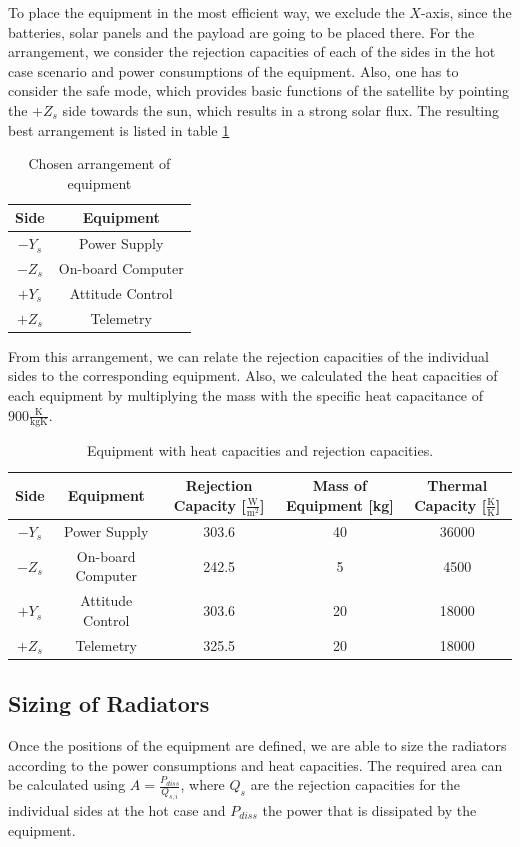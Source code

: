To place the equipment in the most efficient way, we exclude the $X$-axis, since the batteries, solar panels and the payload are going to be placed there. For the arrangement, we consider the rejection capacities of each of the sides in the hot case scenario and power consumptions of the equipment. Also, one has to consider the safe mode, which provides basic functions of the satellite by pointing the +$Z_{s}$ side towards the sun, which results in a strong solar flux. The resulting best arrangement is listed in table \ref{tab:arrangement}

\begin{table}[H]
\centering
\begin{tabular}{ | c| c|}
\hline 
Side & Equipment  \\ \hline
$-Y_{s}$ & Power Supply  \\ \hline
$-Z_{s}$ &On-board Computer \\\hline
$+Y_{s}$ &Attitude Control \\ \hline
$+Z_{s}$ &Telemetry   \\ \hline
\end{tabular}
\caption{Chosen arrangement of equipment}
\label{tab:arrangement}
\end{table}
From this arrangement, we can relate the rejection capacities of the individual sides to the corresponding equipment. Also, we calculated the heat capacities of each equipment by multiplying the mass with the specific heat capacitance of $900\frac{\mathrm{K}}{\mathrm{kgK}}$.


\begin{table}[H]
\centering
\begin{tabular}{ | c| c|c|c|c|}
\hline 
Side & Equipment  & Rejection Capacity [$\frac{\mathrm{W}}{\mathrm{m}^{2}} $] &Mass of Equipment [kg] & Thermal Capacity [$\frac{\mathrm{K}}{\mathrm{K}}$]   \\ \hline
$-Y_{s}$ & Power Supply & 303.6 & 40 &  36000   \\ \hline
$-Z_{s}$ &On-board Computer&  242.5 & 5 & 4500 \\\hline
$+Y_{s}$ &Attitude Control  &  303.6 & 20& 18000 \\ \hline
$+Z_{s}$ &Telemetry & 325.5 & 20 &  18000 \\ \hline
\end{tabular}
\caption{Equipment with heat capacities and rejection capacities.}
\label{tab:heatcapacities}
\end{table} 

\subsection{Sizing of Radiators}
Once  the positions of the equipment are defined, we are able to size the radiators according to the power consumptions and heat capacities. The required area can be calculated using $A=\frac{P_{diss}}{Q_{s,i}}$, where $Q_{s}$ are the rejection capacities for the individual sides at the hot case and $P_{diss}$ the power that is dissipated by the equipment.


